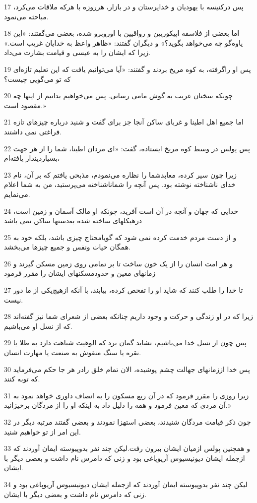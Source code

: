 \par 17 پس درکنیسه با یهودیان و خداپرستان و در بازار، هرروزه با هر‌که ملاقات می‌کرد، مباحثه می‌نمود.
\par 18 اما بعضی از فلاسفه اپیکوریین و رواقیین با اوروبرو شده، بعضی می‌گفتند: «این یاوه‌گو چه می‌خواهد بگوید؟» و دیگران گفتند: «ظاهر واعظ به خدایان غریب است.» زیرا که ایشان را به عیسی و قیامت بشارت می‌داد.
\par 19 پس او راگرفته، به کوه مریخ بردند و گفتند: «آیا می‌توانیم یافت که این تعلیم تازه‌ای که تو می‌گویی چیست؟
\par 20 چونکه سخنان غریب به گوش مامی رسانی. پس می‌خواهیم بدانیم از اینها چه مقصود است.»
\par 21 اما جمیع اهل اطینا و غربای ساکن آنجا جز برای گفت و شنید درباره چیزهای تازه فراغتی نمی داشتند.
\par 22 پس پولس در وسط کوه مریخ ایستاده، گفت: «ای مردان اطینا، شما را از هر جهت بسیاردیندار یافته‌ام،
\par 23 زیرا چون سیر کرده، معابدشما را نظاره می‌نمودم، مذبحی یافتم که بر آن، نام خدای ناشناخته نوشته بود. پس آنچه را شماناشناخته می‌پرستید، من به شما اعلام می‌نمایم.
\par 24 خدایی که جهان و آنچه در آن است آفرید، چونکه او مالک آسمان و زمین است، درهیکلهای ساخته شده به‌دستها ساکن نمی باشد
\par 25 و از دست مردم خدمت کرده نمی شود که گویامحتاج چیزی باشد، بلکه خود به همگان حیات ونفس و جمیع چیزها می‌بخشد.
\par 26 و هر امت انسان را از یک خون ساخت تا بر تمامی روی زمین مسکن گیرند و زمانهای معین و حدودمسکنهای ایشان را مقرر فرمود
\par 27 تا خدا را طلب کنند که شاید او را تفحص کرده، بیابند، با آنکه ازهیچ‌یکی از ما دور نیست.
\par 28 زیرا که در او زندگی و حرکت و وجود داریم چنانکه بعضی از شعرای شما نیز گفته‌اند که از نسل او می‌باشیم.
\par 29 پس چون از نسل خدا می‌باشیم، نشاید گمان برد که الوهیت شباهت دارد به طلا یا نقره یا سنگ منقوش به صنعت یا مهارت انسان.
\par 30 پس خدا اززمانهای جهالت چشم پوشیده، الان تمام خلق رادر هر جا حکم می‌فرماید که توبه کنند.
\par 31 زیرا روزی را مقرر فرمود که در آن ربع مسکون را به انصاف داوری خواهد نمود به آن مردی که معین فرمود و همه را دلیل داد به اینکه او را از مردگان برخیزانید.»
\par 32 چون ذکر قیامت مردگان شنیدند، بعضی استهزا نمودند و بعضی گفتند مرتبه دیگر در این امر از تو خواهیم شنید.
\par 33 و همچنین پولس ازمیان ایشان بیرون رفت.لیکن چند نفر بدوپیوسته ایمان آوردند که از‌جمله ایشان دیونیسیوس آریوپاغی بود و زنی که دامرس نام داشت و بعضی دیگر با ایشان.
\par 34 لیکن چند نفر بدوپیوسته ایمان آوردند که از‌جمله ایشان دیونیسیوس آریوپاغی بود و زنی که دامرس نام داشت و بعضی دیگر با ایشان.

